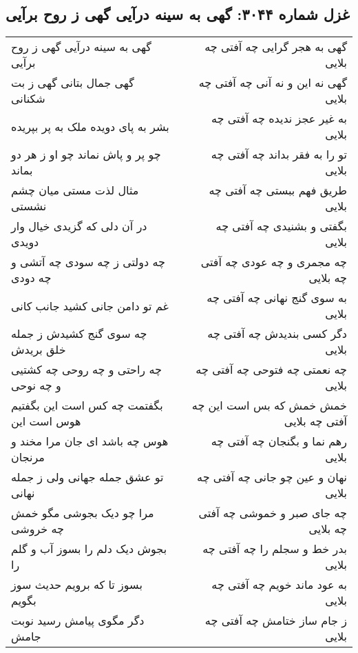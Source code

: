 \begin{center}
\section*{غزل شماره ۳۰۴۴: گهی به سینه درآیی گهی ز روح برآیی}
\label{sec:3044}
\begin{longtable}{l p{0.5cm} r}
گهی به سینه درآیی گهی ز روح برآیی
&&
گهی به هجر گرایی چه آفتی چه بلایی
\\
گهی جمال بتانی گهی ز بت شکنانی
&&
گهی نه این و نه آنی چه آفتی چه بلایی
\\
بشر به پای دویده ملک به پر بپریده
&&
به غیر عجز ندیده چه آفتی چه بلایی
\\
چو پر و پاش نماند چو او ز هر دو بماند
&&
تو را به فقر بداند چه آفتی چه بلایی
\\
مثال لذت مستی میان چشم نشستی
&&
طریق فهم ببستی چه آفتی چه بلایی
\\
در آن دلی که گزیدی خیال وار دویدی
&&
بگفتی و بشنیدی چه آفتی چه بلایی
\\
چه دولتی ز چه سودی چه آتشی و چه دودی
&&
چه مجمری و چه عودی چه آفتی چه بلایی
\\
غم تو دامن جانی کشید جانب کانی
&&
به سوی گنج نهانی چه آفتی چه بلایی
\\
چه سوی گنج کشیدش ز جمله خلق بریدش
&&
دگر کسی بندیدش چه آفتی چه بلایی
\\
چه راحتی و چه روحی چه کشتیی و چه نوحی
&&
چه نعمتی چه فتوحی چه آفتی چه بلایی
\\
بگفتمت چه کس است این بگفتیم هوس است این
&&
خمش خمش که بس است این چه آفتی چه بلایی
\\
هوس چه باشد ای جان مرا مخند و مرنجان
&&
رهم نما و بگنجان چه آفتی چه بلایی
\\
تو عشق جمله جهانی ولی ز جمله نهانی
&&
نهان و عین چو جانی چه آفتی چه بلایی
\\
مرا چو دیک بجوشی مگو خمش چه خروشی
&&
چه جای صبر و خموشی چه آفتی چه بلایی
\\
بجوش دیک دلم را بسوز آب و گلم را
&&
بدر خط و سجلم را چه آفتی چه بلایی
\\
بسوز تا که برویم حدیث سوز بگویم
&&
به عود ماند خویم چه آفتی چه بلایی
\\
دگر مگوی پیامش رسید نوبت جامش
&&
ز جام ساز ختامش چه آفتی چه بلایی
\\
\end{longtable}
\end{center}
